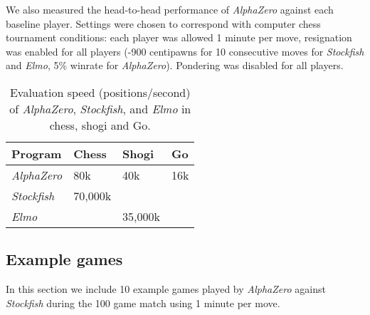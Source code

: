 \documentclass[12pt]{article}
\begin{document}
We also measured the head-to-head performance of \emph{AlphaZero} against each baseline player. Settings were chosen to correspond with computer chess tournament conditions: each player was allowed 1 minute per move, resignation was enabled for all players (-900 centipawns for 10 consecutive moves for \emph{Stockfish} and \emph{Elmo}, 5\% winrate for \emph{AlphaZero}). Pondering was disabled for all players.

\begin{table}
\begin{tabularx}{\textwidth}{XXXX}
\toprule
Program & Chess & Shogi & Go \\
\midrule
\emph{AlphaZero} & 80k & 40k & 16k \\
\emph{Stockfish} & 70,000k & \\
\emph{Elmo} && 35,000k & \\
\bottomrule
\end{tabularx}
\caption{
\label{tab:speed}
Evaluation speed (positions/second) of \emph{AlphaZero}, \emph{Stockfish}, and \emph{Elmo} in chess, shogi and Go.
}
\end{table}

\subsection*{Example games}

In this section we include 10 example games played by \emph{AlphaZero} against \emph{Stockfish} during the 100 game match using 1 minute per move.
\end{document}
